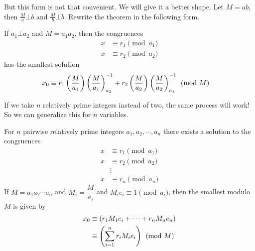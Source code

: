 But this form is not that convenient. We will give it a better shape. Let $M=ab$, then $\frac{M}{a}\bot b$ and $\frac{M}{b}\bot b$. Rewrite the theorem in the following form.
	\begin{theorem}
		If $a_1\bot a_2$ and $M=a_1a_2$, then the congruences
		\begin{align*}
		x & \equiv r_1\pmod{a_1}\\
		x & \equiv r_2\pmod{a_2}
		\end{align*}
		has the smallest solution
		\begin{align*}
		x_0
			&\equiv r_{1}\left(\dfrac{M}{a_1}\right)\left(\dfrac{M}{a_1}\right)^{-1}_{a_2}+r_{2}\left(\dfrac{M}{a_2}\right)\left(\dfrac{M}{a_2}\right)^{-1}_{a_1}\pmod{M}
		\end{align*}
	\end{theorem}
If we take $n$ relatively prime integers instead of two, the same process will work! So we can generalize this for $n$ variables.
	\begin{theorem}[CRT]
		For $n$ pairwise relatively prime integers $a_1,a_2,\cdots,a_n$ there exists a solution to the congruences
			\begin{align*}
				x & \equiv r_1\pmod{a_1}\\
				x & \equiv r_2\pmod{a_2}\\
	   &\vdots\\
				x & \equiv r_n\pmod{a_n}
			\end{align*}
		If $M=a_1a_2\cdots a_n$ and $M_i=\dfrac{M}{a_i}$ and $M_ie_i\equiv1\pmod{a_i}$, then the smallest  modulo $M$ is given by
		\begin{align*}
			x_0
				& \equiv \left(r_1 M_1e_i+\cdots+r_n M_ne_n\right)\\
				& \equiv \left(\sum_{i=1}^{n} r_i M_ie_i\right)\pmod M
		\end{align*}
	\end{theorem}

